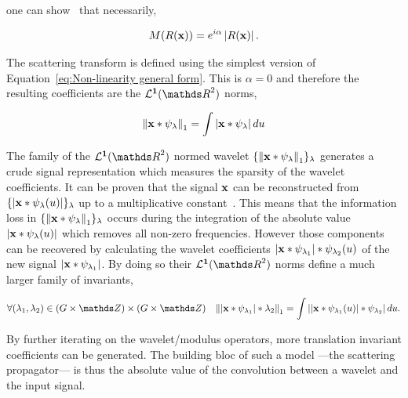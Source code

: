 \documentclass[a4paper,11pt]{report}
\begin{document}
      one can show~\citep{bruna2012commute} that necessarily,
      
      \begin{equation*}
				M(R({\bf x}))= e^{i\alpha}\left| R({\bf x}) \right|.
				\label{eq:Non-linearity general form}
      \end{equation*}

      The scattering transform is defined using the simplest version of Equation~\ref{eq:Non-linearity general form}. This is $\alpha = 0$ and therefore the resulting coefficients are the $\mathbf{\mcalL^{1}}(\dsR^{2})$ norms,
       
      \begin{equation*}
				\label{eq:L1 norm}
				\left\lVert {\bf x} \ast \psi_{\lambda} \right\rVert_{1} = \int \left| {\bf x} \ast \psi_{\lambda} \right| du
      \end{equation*}      
      
      The family of the $\mathbf{\mcalL^{1}}(\dsR^{2})$ normed wavelet $\{ \left\lVert {\bf x} \ast \psi_{\lambda} \right\rVert_{1}\}_{\lambda}$ generates a crude signal representation which measures the sparsity of the wavelet coefficients. It can be proven that the signal ${\bf x}$ can be reconstructed from $\{\left| {\bf x} \ast \psi_{\lambda}(u) \right| \}_{\lambda}$ up to a multiplicative constant~\citep{waldspurger2015phase}. This means that the information loss in $\{\left\lVert {\bf x} \ast \psi_{\lambda} \right\rVert_{1} \}_{\lambda}$ occurs during the integration of the absolute value $\left| {\bf x} \ast \psi_{\lambda}(u) \right|$ which removes all non-zero frequencies. However those components can be recovered by calculating the wavelet coefficients $\left| {\bf x} \ast \psi_{\lambda_{1}} \right| \ast \psi_{\lambda_{2}}(u)$ of the new signal $\left| {\bf x} \ast \psi_{\lambda_{1}} \right|$. By doing so their $\mathbf{\mcalL^{1}}(\dsR^{2})$ norms define a much larger family of invariants,
      
      \begin{equation*}
				\label{eq:2nd order}
				\forall (\lambda_{1}, \lambda_{2}) \in (G \times \dsZ) \times (G \times \dsZ) \;\;\; 
				\norm{ \abs{\bfx \ast \psi_{\lambda_{1}}} \ast \lambda_{2}}_{1} =
				\int \abs{ \abs{\bfx \ast \psi_{\lambda_{1}}(u)} \ast \psi_{\lambda_{2}}} du.
      \end{equation*}          
      
      By further iterating on the wavelet/modulus operators, more translation invariant coefficients can be generated. The building bloc of such a model ---the scattering propagator--- is thus the absolute value of the convolution between a wavelet and the input signal.
      
\end{document}
